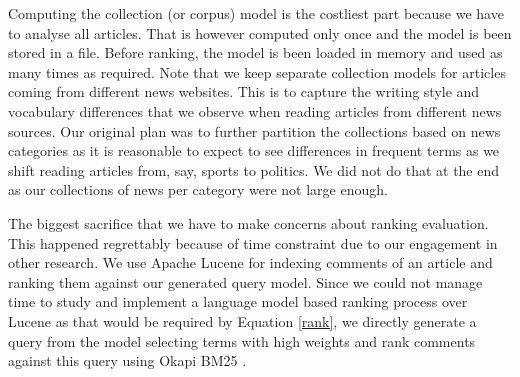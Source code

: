 \documentclass[article]{IEEEtran}
\begin{document}
Computing the collection (or corpus) model is the costliest part because we have to analyse all articles. That is however computed only once and the model is been stored in a file. Before ranking, the model is been loaded in memory and used as many times as required. Note that we keep separate collection models for articles coming from different news websites. This is to capture the writing style and vocabulary differences that we observe when reading articles from different news sources. Our original plan was to further partition the collections based on news categories as it is reasonable to expect to see differences in frequent terms as we shift reading articles from, say, sports to politics. We did not do that at the end as our collections of news per category were not large enough.     

The biggest sacrifice that we have to make concerns about ranking evaluation. This happened regrettably because of time constraint due to our engagement in other research. We use Apache Lucene \cite{McCandless:2010:LAS:1893016} for indexing comments of an article and ranking them against our generated query model. Since we could not manage time to study and implement a language model based ranking process over Lucene as that would be required by Equation \ref{rank}, we directly generate a query from the model selecting terms with high weights and 
rank comments against this query using Okapi BM25 \cite{Robertson96okapiat}.
\end{document}
